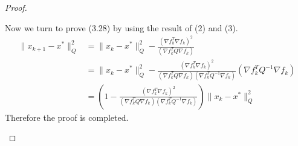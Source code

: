\documentclass[11pt,a4paper]{article}
\renewcommand{\(}{\left(}
\renewcommand{\)}{\right)}
\begin{document}
\begin{proof}
\begin{enumerate}[(1)]
  		Now we turn to prove (3.28) by using the result of (2) and (3).
  		\begin{align*}
  		\|x_{k+1} - x^{*}\|^{2}_{Q}
  		&=\|x_{k} - x^{*}\|^{2}_{Q}-\frac{(\nabla f_{k}^{T}\nabla f_{k})^2}{(\nabla f^{T}_{k}Q\nabla f_{k})}\\
  		&=\|x_{k} - x^{*}\|^{2}_{Q}-\frac{(\nabla f_{k}^{T}\nabla f_{k})^2}{(\nabla f^{T}_{k}Q\nabla f_{k})(\nabla f_{k}^{T}Q^{-1}\nabla f_{k})}(\nabla f_{k}^{T}Q^{-1}\nabla f_{k})\\
  		&=(1-\frac{(\nabla f_{k}^{T}\nabla f_{k})^2}{(\nabla f_{k}^{T}Q\nabla f_{k})(\nabla f_{k}^{T}Q^{-1}\nabla f_{k})})\|x_{k} - x^{*}\|^{2}_{Q}
  		\end{align*}
  		Therefore the proof is completed. 
  	\end{enumerate}
  \end{proof}
  
\end{document}
